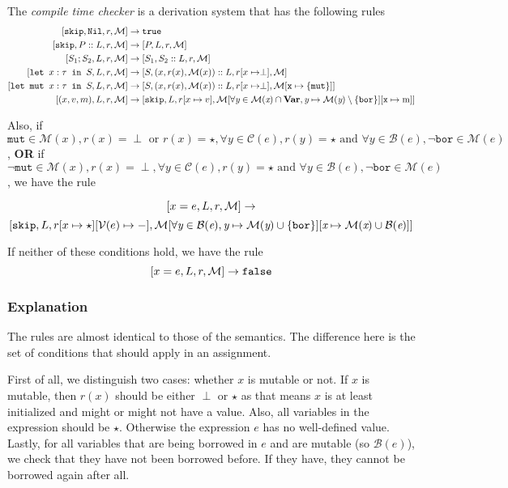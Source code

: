 \begin{definition}
\label{compiletimecheckerb}
The \emph{compile time checker} is a derivation system that has the following rules
\begin{align*}
\ccb{\texttt{skip}}{\texttt{Nil}}{r}{M} & \to \texttt{true}  \\
\ccb{\texttt{skip}}{P::L}{r}{M}       & \to \ccb{P}{L}{r}{M}  \\
\ccb{S_1; S_2}{L}{r}{M}                 & \to \ccb{S_1}{S_2::L}{r}{M}  \\
\ccb{\letm{x}{S}}{L}{r}{M} & \to \ccb{S}{(x,r(x),\mathcal{M}(x))::L}{r[x\mapsto \perp]}{M} \\
\ccb{\letmut{x}{S}}{L}{r}{M} & \to \ccb{S}{(x,r(x),\mathcal{M}(x))::L}{r[x\mapsto \perp]}{M[\texttt{x}\mapsto\{\texttt{mut}\}]} \\
\ccb{(x,v,m)}{L}{r}{M}                    & \to \ccb{\texttt{skip}}{L}{r[x \mapsto v]}{M[\forall \textit{y} \in M(\textit{x})\cap\textbf{Var}, \textit{y} \mapsto M(\textit{y}) \setminus \{\texttt{bor}\}][\texttt{x} \mapsto \textrm{m}]} 
\end{align*}

Also, if $\texttt{mut} \in \mathcal{M}(x), r(x) = \perp \textrm{ or } r(x) = \star, \forall y \in \mathcal{C}(e), r(y) = \star \textrm{ and } \forall y \in \mathcal{B}(e), \neg \texttt{bor} \in \mathcal{M}(e)$, \textbf{OR} if $\neg \texttt{mut} \in \mathcal{M}(x), r(x) = \perp, \forall y \in \mathcal{C}(e), r(y) = \star \textrm{ and } \forall y \in \mathcal{B}(e), \neg \texttt{bor} \in \mathcal{M}(e)$, we have the rule

$$[ x=e, L, r, \mathcal{M} ]\to$$ 
$$[ \texttt{skip}, L, r[x\mapsto \star][\mathcal{V}(e) \mapsto -], \mathcal{M[\forall \textit{y} \in B(\textit{e}), \textit{y}\mapsto M(\textit{y})\cup \{\texttt{bor} \} ][\textit{x} \mapsto M(\textit{x}) \cup B(\textit{e})]} ]$$

If neither of these conditions hold, we have the rule 
$$[ x=e, L, r, \mathcal{M} ] \to \texttt{false}$$
\end{definition}

\subsubsection*{Explanation}
The rules are almost identical to those of the semantics. The difference here is the set of conditions that should apply in an assignment. 

First of all, we distinguish two cases: whether $x$ is mutable or not. If $x$ is mutable, then $r(x)$ should be either $\perp$ or $\star$ as that means $x$ is at least initialized and might or might not have a value. Also, all variables in the expression should be $\star$. Otherwise the expression $e$ has no well-defined value. Lastly, for all variables that are being borrowed in $e$ and are mutable (so $\mathcal{B}(e)$), we check that they have not been borrowed before. If they have, they cannot be borrowed again after all. 

